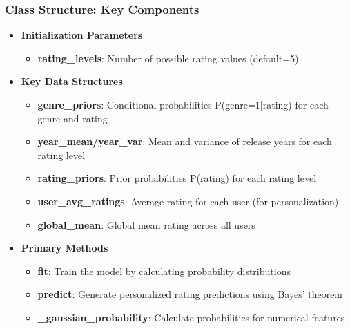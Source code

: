 \documentclass{beamer}
\begin{document}
\begin{frame}
\frametitle{Class Structure: Key Components}

\begin{itemize}
    \item \textbf{Initialization Parameters}
    \begin{itemize}
        \item \textbf{rating\_levels}: Number of possible rating values (default=5)
    \end{itemize}
    
    \item \textbf{Key Data Structures}
    \begin{itemize}
        \item \textbf{genre\_priors}: Conditional probabilities P(genre=1|rating) for each genre and rating
        \item \textbf{year\_mean/year\_var}: Mean and variance of release years for each rating level
        \item \textbf{rating\_priors}: Prior probabilities P(rating) for each rating level
        \item \textbf{user\_avg\_ratings}: Average rating for each user (for personalization)
        \item \textbf{global\_mean}: Global mean rating across all users
    \end{itemize}
    
    \item \textbf{Primary Methods}
    \begin{itemize}
        \item \textbf{fit}: Train the model by calculating probability distributions
        \item \textbf{predict}: Generate personalized rating predictions using Bayes' theorem
        \item \textbf{\_gaussian\_probability}: Calculate probabilities for numerical features
    \end{itemize}
\end{itemize}
\end{frame}
\end{document}
